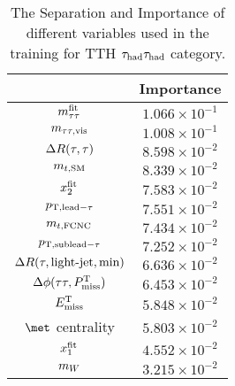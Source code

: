 \begin{table}
\caption{The Separation and Importance of different variables used in the training for TTH $\tau_\text{had}{}\tau_\text{had}$ category.}
\centering
\begin{tabular}{|c|c|} \hline
 & Importance \\ \hline

$m_{\tau\tau}^{\text{fit}}     $  & $1.066\times10^{-1}$  \\ \hline
$m_{\tau\tau,\text{vis}}      $  & $1.008\times10^{-1}$  \\ \hline
$\Delta R(\tau,\tau)       $  & $8.598\times10^{-2}$  \\ \hline
$m_{t,\text{SM}}         $  & $8.339\times10^{-2}$  \\ \hline
$x_2^{\text{fit}}          $  & $7.583\times10^{-2}$  \\ \hline
$p_{\text{T},\text{lead}-\tau}         $  & $7.551\times10^{-2}$  \\ \hline
$m_{t,\text{FCNC}}         $  & $7.434\times10^{-2}$  \\ \hline
$p_{\text{T},\text{sublead}-\tau}         $  & $7.252\times10^{-2}$  \\ \hline
$\Delta R(\tau,\text{light-jet},\text{min})      $  & $6.636\times10^{-2}$  \\ \hline
$\Delta\phi(\tau\tau,P^{\text{T}}_{\text{miss}})  $  & $6.453\times10^{-2}$  \\ \hline
$E^{\text{T}}_{\text{miss}}         $  & $5.848\times10^{-2}$  \\ \hline
$\met$ centrality   & $5.803\times10^{-2}$  \\ \hline
$x_1^{\text{fit}}          $  & $4.552\times10^{-2}$  \\ \hline
$m_W          $  & $3.215\times10^{-2}$  \\ \hline

\end{tabular}
\label{tab:mva_sep_imp_hh_4j}
\end{table}

